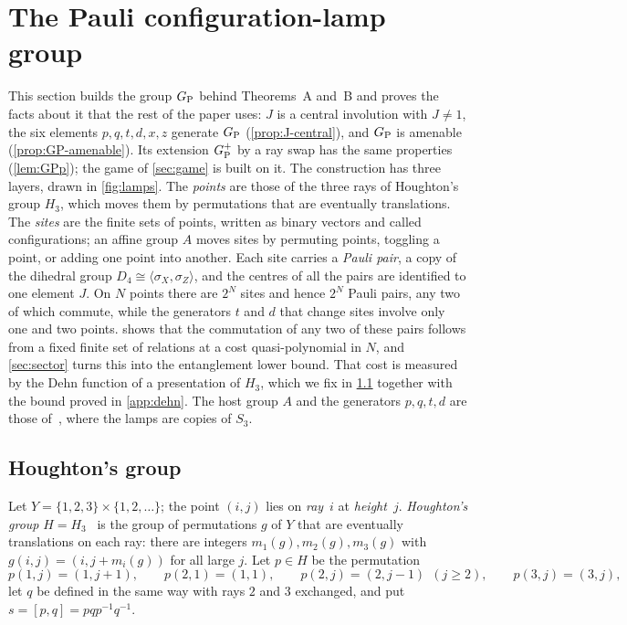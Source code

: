 \section{The Pauli configuration-lamp group}\label{sec:group}

This section builds the group $G_{\mathrm P}$ behind Theorems~A and~B and proves the facts about it that the rest of the paper uses: $J$ is a
central involution with $J\ne1$, the six elements $p,q,t,d,x,z$ generate $G_{\mathrm P}$ (\cref{prop:J-central}), and $G_{\mathrm P}$ is amenable
(\cref{prop:GP-amenable}). Its extension $G_{\mathrm P}^{+}$ by a ray swap has the same properties (\cref{lem:GPp}); the game of \cref{sec:game} is
built on it. The construction has three layers, drawn in \cref{fig:lamps}. The \emph{points} are those of the three rays of Houghton's
group $H_3$, which moves them by permutations that are eventually translations. The \emph{sites} are the finite sets of points, written
as binary vectors and called configurations; an affine group $A$ moves sites by permuting points, toggling a point, or adding one point
into another. Each site carries a \emph{Pauli pair}, a copy of the dihedral group $D_4\cong\langle\sigma_X,\sigma_Z\rangle$, and the
centres of all the pairs are identified to one element $J$. On $N$ points there are $2^N$ sites and hence $2^N$ Pauli pairs, any two of
which commute, while the generators $t$ and $d$ that change sites involve only one and two points.  shows that the commutation of any two
of these pairs follows from a fixed finite set of relations at a cost quasi-polynomial in $N$, and \cref{sec:sector} turns this into the
entanglement lower bound. That cost is measured by the Dehn function of a presentation of $H_3$, which we fix in
\cref{sec:group-houghton} together with the bound proved in \cref{app:dehn}. The host group $A$ and the generators $p,q,t,d$ are those
of~\cite[Section~3]{DM-lamps}, where the lamps are copies of $S_3$.

\subsection{Houghton's group}\label{sec:group-houghton}

\begin{definition}\label{def:houghton}
Let $Y=\{1,2,3\}\times\{1,2,\dots\}$; the point $(i,j)$ lies on \emph{ray}~$i$ at \emph{height}~$j$. \emph{Houghton's group}
$H=H_3$~\cite{Hou78} is the group of permutations $g$ of $Y$ that are eventually translations on each ray: there are integers
$m_1(g),m_2(g),m_3(g)$ with $g(i,j)=(i,j+m_i(g))$ for all large $j$. Let $p\in H$ be the permutation
\[
p(1,j)=(1,j+1),\qquad p(2,1)=(1,1),\qquad p(2,j)=(2,j-1)\ \ (j\ge2),\qquad p(3,j)=(3,j),
\]
let $q$ be defined in the same way with rays $2$ and $3$ exchanged, and put $s=[p,q]=pqp^{-1}q^{-1}$.
\end{definition}

